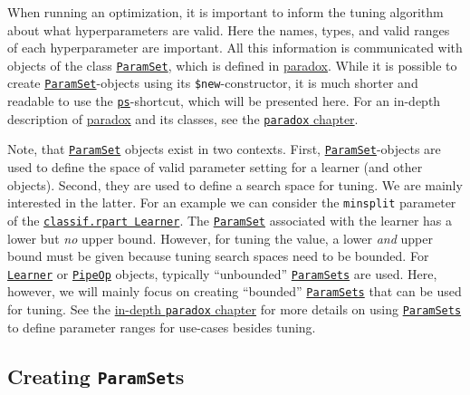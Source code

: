 \documentclass[
]{scrbook}
\begin{document}
When running an optimization, it is important to inform the tuning algorithm about what hyperparameters are valid.
Here the names, types, and valid ranges of each hyperparameter are important.
All this information is communicated with objects of the class \href{https://paradox.mlr-org.com/reference/ParamSet.html}{\texttt{ParamSet}}, which is defined in \href{https://paradox.mlr-org.com}{paradox}.
While it is possible to create \href{https://paradox.mlr-org.com/reference/ParamSet.html}{\texttt{ParamSet}}-objects using its \texttt{\$new}-constructor, it is much shorter and readable to use the \href{https://paradox.mlr-org.com/reference/ps.html}{\texttt{ps}}-shortcut, which will be presented here.
For an in-depth description of \href{https://paradox.mlr-org.com}{paradox} and its classes, see the \protect\hyperlink{paradox}{\texttt{paradox} chapter}.

Note, that \href{https://paradox.mlr-org.com/reference/ParamSet.html}{\texttt{ParamSet}} objects exist in two contexts.
First, \href{https://paradox.mlr-org.com/reference/ParamSet.html}{\texttt{ParamSet}}-objects are used to define the space of valid parameter setting for a learner (and other objects).
Second, they are used to define a search space for tuning.
We are mainly interested in the latter.
For an example we can consider the \texttt{minsplit} parameter of the \href{https://mlr3.mlr-org.com/reference/mlr_learners_classif.rpart.html}{\texttt{classif.rpart\ Learner}}.
The \href{https://paradox.mlr-org.com/reference/ParamSet.html}{\texttt{ParamSet}} associated with the learner has a lower but \emph{no} upper bound.
However, for tuning the value, a lower \emph{and} upper bound must be given because tuning search spaces need to be bounded.
For \href{https://mlr3.mlr-org.com/reference/Learner.html}{\texttt{Learner}} or \href{https://mlr3pipelines.mlr-org.com/reference/PipeOp.html}{\texttt{PipeOp}} objects, typically ``unbounded'' \href{https://paradox.mlr-org.com/reference/ParamSet.html}{\texttt{ParamSets}} are used.
Here, however, we will mainly focus on creating ``bounded'' \href{https://paradox.mlr-org.com/reference/ParamSet.html}{\texttt{ParamSets}} that can be used for tuning.
See the \protect\hyperlink{paradox}{in-depth \texttt{paradox} chapter} for more details on using \href{https://paradox.mlr-org.com/reference/ParamSet.html}{\texttt{ParamSets}} to define parameter ranges for use-cases besides tuning.

\hypertarget{creating-paramsets}{%
\subsection{\texorpdfstring{Creating \texttt{ParamSet}s}{Creating ParamSets}}\label{creating-paramsets}}
\end{document}

